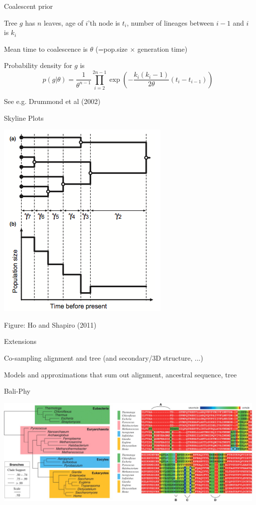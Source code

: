 \documentclass{beamer}
\begin{document}
\begin{frame}{Coalescent prior}

\itemb
\item Tree $g$ has $n$ leaves, age of $i$'th node is $t_i$, number of lineages between $i-1$ and $i$ is $k_i$
\item Mean time to coalescence is $\theta$ (=pop.size $\times$ generation time)
\item Probability density for $g$ is
\[
p(g|\theta) = \frac{1}{\theta^{n-1}} \prod_{i=2}^{2n-1} \exp\left(-\frac{k_i(k_i-1)}{2\theta}(t_i-t_{i-1})\right)
\]
\item See e.g. Drummond et al (2002)
\iteme

\end{frame}

\begin{frame}{Skyline Plots}

\centerline{  \includegraphics[width=.5\textwidth]{SkylinePlot.png}  }

Figure: Ho and Shapiro (2011)

\end{frame}

\begin{frame}{Extensions}

\itemb
\item Co-sampling alignment and tree (and secondary/3D structure, ...)
\item Models and approximations that sum out alignment, ancestral sequence, tree
\iteme

\end{frame}

\begin{frame}{Bali-Phy}

  \includegraphics[width=.9\textwidth]{BaliPhy.jpg}

\end{frame}
\end{document}
